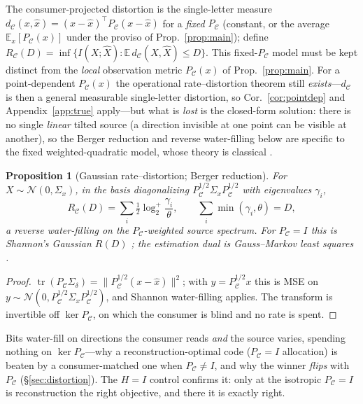\documentclass[lettersize,onecolumn]{IEEEtran}
\newtheorem{proposition}{Proposition}
\theoremstyle{definition}
\theoremstyle{remark}
\newcommand{\PC}{P_{\mathcal{C}}}
\newcommand{\Sd}{\Sigma_{\delta}}
\newcommand{\tr}{\operatorname{tr}}
\newcommand{\E}{\mathbb{E}}
\begin{document}
The consumer-projected distortion is the single-letter measure
$d_{\mathcal{C}}(x,\hat x)=(x-\hat x)^\top\PC(x-\hat x)$ for a \emph{fixed} $\PC$
(constant, or the average $\E_x[\PC(x)]$ under the proviso of Prop.~\ref{prop:main});
define $R_{\mathcal{C}}(D)=\inf\{I(X;\hat X):\E\,d_{\mathcal{C}}(X,\hat X)\le D\}$.
This fixed-$\PC$ model must be kept distinct from the \emph{local} observation metric
$\PC(x)$ of Prop.~\ref{prop:main}. For a point-dependent $\PC(x)$ the operational
rate--distortion theorem still \emph{exists}---$d_{\mathcal{C}}$ is then a general
measurable single-letter distortion, so Cor.~\ref{cor:pointdep} and
Appendix~\ref{app:true} apply---but what is \emph{lost} is the closed-form solution:
there is no single \emph{linear} tilted source (a direction invisible at one point can
be visible at another), so the Berger reduction and reverse water-filling below are
specific to the fixed weighted-quadratic model, whose theory is classical
\cite{berger1971}.

\begin{proposition}[Gaussian rate--distortion; Berger reduction]\label{prop:rd}
For $X\sim\mathcal{N}(0,\Sigma_x)$, in the basis diagonalizing
$\PC^{1/2}\Sigma_x\PC^{1/2}$ with eigenvalues $\gamma_i$,
\[
R_{\mathcal{C}}(D)=\sum_i \tfrac12\log_2^{+}\!\frac{\gamma_i}{\theta},\qquad
\sum_i\min(\gamma_i,\theta)=D,
\]
a reverse water-filling on the $\PC$-weighted source spectrum. For $\PC=I$ this is
Shannon's Gaussian $R(D)$ \cite{shannon1959}; the estimation dual is Gauss--Markov
least squares \cite{gauss1809}.
\end{proposition}
\begin{proof}
$\tr(\PC\Sd)=\|\PC^{1/2}(x-\hat x)\|^2$; with $y=\PC^{1/2}x$ this is MSE on
$y\sim\mathcal{N}(0,\PC^{1/2}\Sigma_x\PC^{1/2})$, and Shannon water-filling applies.
The transform is invertible off $\ker\PC$, on which the consumer is blind and no rate
is spent.
\end{proof}

Bits water-fill on directions the consumer reads \emph{and} the source varies,
spending nothing on $\ker\PC$---why a reconstruction-optimal code ($\PC=I$
allocation) is beaten by a consumer-matched one when $\PC\ne I$, and why the winner
\emph{flips} with $\PC$ (\S\ref{sec:distortion}). The $H=I$ control confirms it: only
at the isotropic $\PC=I$ is reconstruction the right objective, and there it is
exactly right.
\end{document}
